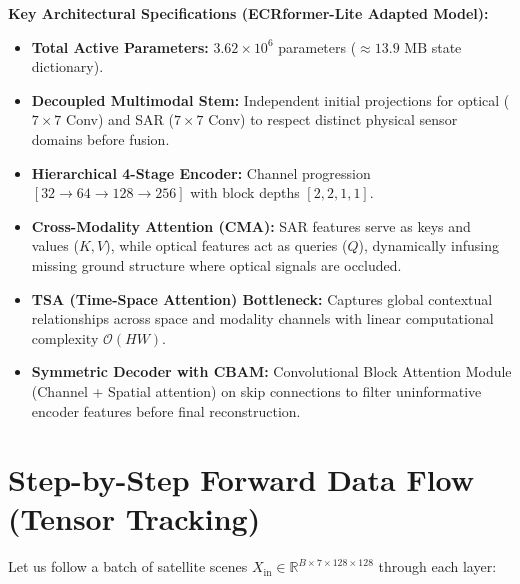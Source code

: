 \documentclass[11pt,a4paper]{article}
\begin{document}
\begin{center}
\begin{tcolorbox}[colback=boxbg,colframe=bordercolor,width=0.98\linewidth]
\textbf{\textcolor{primary}{Key Architectural Specifications (ECRformer-Lite Adapted Model):}}
\begin{itemize}[leftmargin=1.5em, itemsep=0.3em]
    \item \textbf{Total Active Parameters:} $3.62 \times 10^6$ parameters ($\approx 13.9\text{ MB}$ state dictionary).
    \item \textbf{Decoupled Multimodal Stem:} Independent initial projections for optical ($7 \times 7$ Conv) and SAR ($7 \times 7$ Conv) to respect distinct physical sensor domains before fusion.
    \item \textbf{Hierarchical 4-Stage Encoder:} Channel progression $[32 \to 64 \to 128 \to 256]$ with block depths $[2, 2, 1, 1]$.
    \item \textbf{Cross-Modality Attention (CMA):} SAR features serve as keys and values ($K, V$), while optical features act as queries ($Q$), dynamically infusing missing ground structure where optical signals are occluded.
    \item \textbf{TSA (Time-Space Attention) Bottleneck:} Captures global contextual relationships across space and modality channels with linear computational complexity $\mathcal{O}(HW)$.
    \item \textbf{Symmetric Decoder with CBAM:} Convolutional Block Attention Module (Channel + Spatial attention) on skip connections to filter uninformative encoder features before final reconstruction.
\end{itemize}
\end{tcolorbox}
\end{center}

\newpage

\section{Step-by-Step Forward Data Flow (Tensor Tracking)}

Let us follow a batch of satellite scenes $X_{\text{in}} \in \mathbb{R}^{B \times 7 \times 128 \times 128}$ through each layer:
\end{document}
